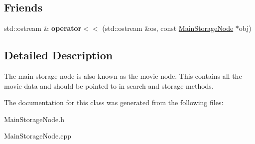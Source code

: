 \subsection*{Friends}
\begin{DoxyCompactItemize}
\item 
\mbox{\label{class_main_storage_node_ab4c8d839103818503935eeb693572f86}} 
std\+::ostream \& {\bfseries operator$<$$<$} (std\+::ostream \&os, const \hyperlink{class_main_storage_node}{Main\+Storage\+Node} $\ast$obj)
\end{DoxyCompactItemize}


\subsection{Detailed Description}
The main storage node is also known as the movie node. This contains all the movie data and should be pointed to in search and storage methods. 

The documentation for this class was generated from the following files\+:\begin{DoxyCompactItemize}
\item 
Main\+Storage\+Node.\+h\item 
Main\+Storage\+Node.\+cpp\end{DoxyCompactItemize}
